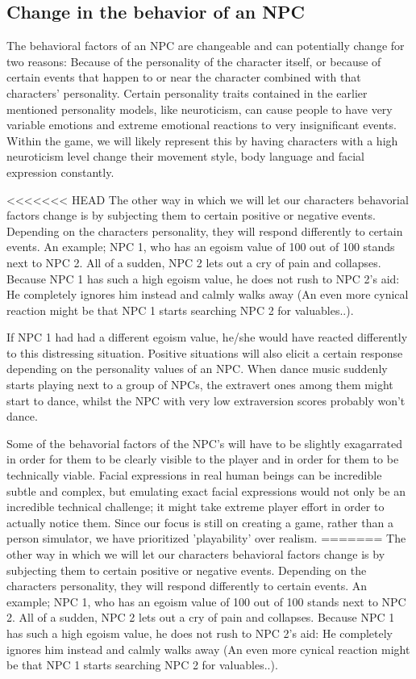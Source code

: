 \documentclass{article}
\begin{document}
  \newpage
  \subsection{Change in the behavior of an NPC}
  The behavioral factors of an NPC are changeable and can potentially change for two reasons: Because of the personality of the character itself, or because of certain events that happen to or near the character combined with that characters' personality. Certain personality traits contained in the earlier mentioned personality models, like neuroticism, can cause people to have very variable emotions and extreme emotional reactions to very insignificant events. Within the game, we will likely represent this by having characters with a high neuroticism level change their movement style, body language and facial expression constantly.

<<<<<<< HEAD
  The other way in which we will let our characters behavorial factors change is by subjecting them to certain positive or negative events. Depending on the characters personality, they will respond differently to certain events. An example; NPC 1, who has an egoism value of 100 out of 100 stands next to NPC 2. All of a sudden, NPC 2 lets out a cry of pain and collapses. Because NPC 1 has such a high egoism value, he does not rush to NPC 2's aid: He completely ignores him instead and calmly walks away (An even more cynical reaction might be that NPC 1 starts searching NPC 2 for valuables..).

  If NPC 1 had had a different egoism value, he/she would have reacted differently to this distressing situation. Positive situations will also elicit a certain response depending on the personality values of an NPC. When dance music suddenly starts playing next to a group of NPCs, the extravert ones among them might start to dance, whilst the NPC with very low extraversion scores probably won't dance. 

  Some of the behavorial factors of the NPC's will have to be slightly exagarrated in order for them to be clearly visible to the player and in order for them to be technically viable. Facial expressions in real human beings can be incredible subtle and complex, but emulating exact facial expressions would not only be an incredible technical challenge; it might take extreme player effort in order to actually notice them. Since our focus is still on creating a game, rather than a person simulator, we have prioritized 'playability' over realism.
=======
  The other way in which we will let our characters behavioral factors change is by subjecting them to certain positive or negative events. Depending on the characters personality, they will respond differently to certain events. An example; NPC 1, who has an egoism value of 100 out of 100 stands next to NPC 2. All of a sudden, NPC 2 lets out a cry of pain and collapses. Because NPC 1 has such a high egoism value, he does not rush to NPC 2's aid: He completely ignores him instead and calmly walks away (An even more cynical reaction might be that NPC 1 starts searching NPC 2 for valuables..).
\end{document}
